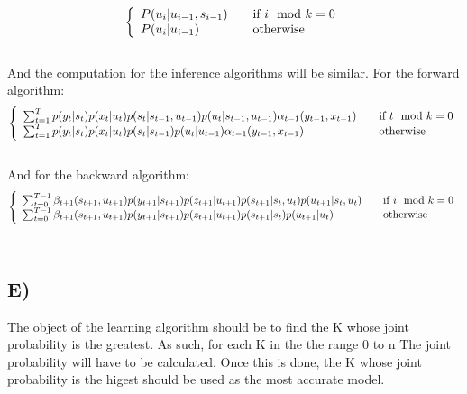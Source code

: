 \documentclass{report}
\begin{document}
\begin{equation}
  \left\{
  \begin{array}{l l}
    P(u_i | u_{i-1}, s_{i-1}) & \quad \text{if } i \mod k = 0 \\
    P(u_i | u_{i-1}) & \quad \text{otherwise}

  \end{array} \right.
\end{equation}\\
And the computation for the inference algorithms will be similar. For the forward
algorithm:
\begin{equation}
  \left\{
  \begin{array}{l l}
  \sum_{t = 1}^T p(y_t | s_t) p(x_t | u_t) p(s_t | s_{t-1}, u_{t-1}) p(u_t | s_{t-1}, u_{t-1}) \alpha_{t-1}(y_{t-1}, x_{t-1}) & \quad \text{if } t \mod k = 0 \\
  \sum_{t = 1}^T p(y_t | s_t) p(x_t | u_t) p(s_t | s_{t-1}) p(u_t | u_{t-1}) \alpha_{t-1}(y_{t-1}, x_{t-1}) & \quad \text{otherwise}

  \end{array} \right.
\end{equation}\\
And for the backward algorithm:
\begin{equation}
  \left\{
  \begin{array}{l l}
  \sum_{t=0}^{T-1} \beta_{t+1}(s_{t+1}, u_{t+1}) p(y_{t+1} | s_{t+1}) p(z_{t+1} | u_{t+1}) p(s_{t+1} | s_t, u_t) p(u_{t+1} | s_t, u_t) & \quad \text{if } i \mod k = 0 \\
  \sum_{t=0}^{T-1} \beta_{t+1}(s_{t+1}, u_{t+1}) p(y_{t+1} | s_{t+1}) p(z_{t+1} | u_{t+1}) p(s_{t+1} | s_t) p(u_{t+1} | u_t) & \quad \text{otherwise}

  \end{array} \right.
\end{equation}\\
\subsection*{E)}
The object of the learning algorithm should be to find the K whose joint probability
is the greatest. As such, for each K in the the range 0 to n The joint probability
will have to be calculated. Once this is done, the K whose joint probability is the
higest should be used as the most accurate model.
\end{document}
